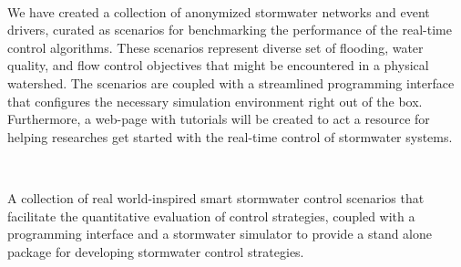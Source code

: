 \

We have created a collection of anonymized stormwater networks and event drivers, curated as scenarios for benchmarking the performance of the real-time control algorithms.
These scenarios represent diverse set of flooding, water quality, and flow control objectives that might be encountered in a physical watershed.
The scenarios are coupled with a streamlined programming interface that configures the necessary simulation environment right out of the box.
Furthermore, a web-page with tutorials will be created to act a resource for helping researches get started with the real-time control of stormwater systems.

\

A collection of real world-inspired smart stormwater control scenarios that facilitate the quantitative evaluation of control strategies, coupled with a programming interface and a stormwater simulator to provide a stand alone package for developing stormwater control strategies.

